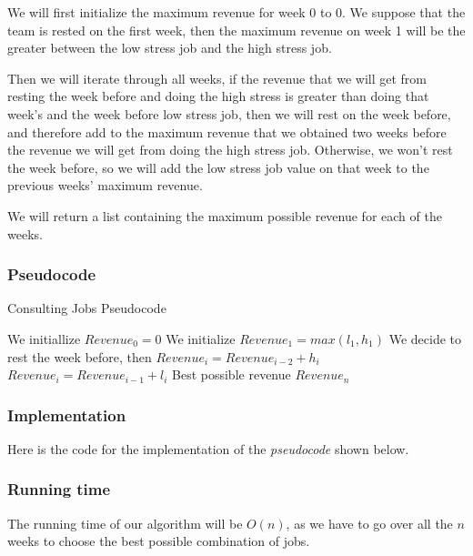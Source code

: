 \documentclass{article}
\begin{document}
We will first initialize the maximum revenue for week 0 to 0. We suppose that the team is rested on the first week, then the maximum revenue on week 1 will be the greater between the low stress job and the high stress job.

Then we will iterate through all weeks, if the revenue that we will get from resting the week before and doing the high stress is greater than doing that week's and the week before low stress job, then we will rest on the week before, and therefore add to the maximum revenue that we obtained two weeks before the revenue we will get from doing the high stress job. Otherwise, we won't rest the week before, so we will add the low stress job value on that week to the previous weeks' maximum revenue.

We will return a list containing the maximum possible revenue for each of the weeks.

\subsubsection*{Pseudocode}

\begin{algorithm}[H]
\caption{Consulting Jobs Pseudocode}
\begin{algorithmic}[1]
\State We initiallize $Revenue_0 = 0$
\State We initialize $Revenue_1 = max(l_1,h_1)$
  \State We decide to rest the week before, then
  \State $Revenue_i = Revenue_{i-2}+h_i$
 \Else
  \State $Revenue_i = Revenue_{i-1}+l_i$
 \EndIf
\EndFor
\State \Return Best possible revenue $Revenue_n$
\end{algorithmic}
\end{algorithm}

\subsubsection*{Implementation}

Here is the code for the implementation of the \textit{pseudocode} shown below.



\subsubsection*{Running time}

The running time of our algorithm will be $O(n)$, as we have to go over all the $n$ weeks to choose the best possible combination of jobs.
\end{document}
